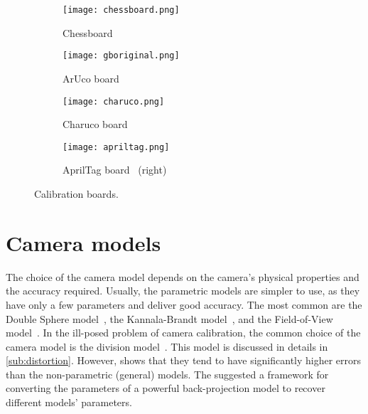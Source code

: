 \begin{figure}[h]
	\centering
	\begin{subfigure}[b]{0.45\textwidth}
		\centering
		\texttt{[image: chessboard.png]}
		\caption{Chessboard~\cite{OpenCVCameraCalibration}}
		\label{fig:chessboard}
	\end{subfigure}
	\hfill
	\begin{subfigure}[b]{0.45\textwidth}
		\centering
		\texttt{[image: gboriginal.png]}
		\caption{ArUco board~\cite{OpenCVDetectionArUco}}
		\label{fig:gboriginal}
	\end{subfigure}
	\begin{subfigure}[b]{0.45\textwidth}
		\centering
		\texttt{[image: charuco.png]}
		\caption{Charuco board~\cite{OpenCVDetectionChArUco}}
		\label{fig:charuco}
	\end{subfigure}
	\hfill
	\begin{subfigure}[b]{0.45\textwidth}
		\centering
		\texttt{[image: apriltag.png]}
		\caption{AprilTag board~\cite{rosebrockAprilTagPython2020} (right)}
		\label{fig:apriltag}
	\end{subfigure}
	\caption{Calibration boards.}
\end{figure}

\section{Camera models}\label{sub:camera_models}

The choice of the camera model depends on the camera's physical properties
and the accuracy required. Usually, the parametric models are simpler to use, as
they have only a few parameters and deliver good accuracy.
The most common are the Double Sphere
model~\citep{usenkoDoubleSphereCamera2018}, the Kannala-Brandt
model~\citep{kannalaGenericCameraModel2006}, and the Field-of-View
model~\citep{devernayStraightLinesHave2001}.
In the ill-posed problem of camera calibration, the common choice
of the camera model is the division
model~\citep{fitzgibbonSimultaneousLinearEstimation2001}. This model is
discussed in details in \cref{sub:distortion}.
However, \cite{schopsWhyHaving102020} shows that they tend to have
significantly higher errors than the non-parametric (general) models.
The \cite{lochmanBabelCalibUniversalApproach2021} suggested a framework for
converting the parameters of a powerful back-projection
\cite{zhangFlexibleNewTechnique2000} model to recover different models' parameters.

